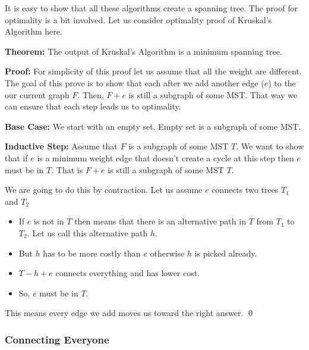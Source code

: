 \documentclass[a4paper, 12pt]{article}
\newcommand{\theorem}{\vspace{1em}\noindent\textbf{Theorem:} }
\newcommand{\inductivestep}{\vspace{0.25em}\noindent\textbf{Inductive Step:} }
\renewcommand{\proof}{\vspace{0.5em}\noindent\textbf{Proof:} }
\newcommand{\basecase}{\vspace{0.25em}\noindent\textbf{Base Case:} }
\newcommand{\qedd}{\qed\newline}
\begin{document}
	It is easy to show that all these algorithms create a spanning tree. The proof for optimality is a bit involved. Let us consider optimality  proof of Kruskal's Algorithm here.
	
	\theorem The output of Kruskal's Algorithm is a minimum spanning tree.
	
	\proof For simplicity of this proof let us assume that all the weight are different. The goal of this prove is to show that each after we add another edge ($e$) to the our current graph $F$. Then, $F+e$ is still a subgraph of some MST. That way we can ensure that each step leads us to optimality.
	
	\basecase We start with an empty set. Empty set is a subgraph of some MST. \checkmark
	
	\inductivestep Assume that $F$ is a subgraph of some MST $T$. We want to show that if $e$ is a minimum weight edge that doesn't create a cycle at this step then $e$ must be in $T$. That is $F+e$ is still a subgraph of some MST $T$.
	
	We are going to do this by contraction. Let us assume $e$ connects two trees $T_1$ and $T_2$
	
	\begin{itemize}
		\item If $e$ is not in $T$ then means that there is an alternative path in $T$ from $T_1$ to $T_2$. Let us call this alternative path $h$.
		\begin{center}
		\end{center}
		\item But $h$ has to be more costly than $e$ otherwise $h$ is picked already.
		\item $T-h+e$ connects everything and has lower cost.
		\item So, $e$ must be in $T$.
	\end{itemize}
	This means every edge we add moves us toward the right answer.
	\qedd
	
	
	\subsubsection*{Connecting Everyone}
	
\end{document}
